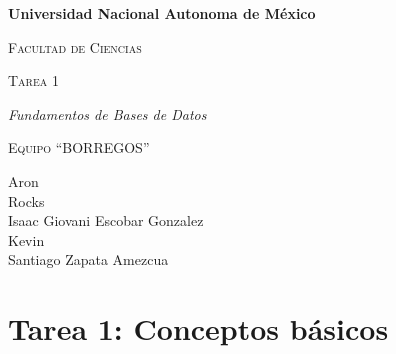 \documentclass[12pt]{report}
\begin{document}
\begin{titlepage}
\centering
{\bfseries\LARGE Universidad Nacional Autonoma de M\'exico \par}
\vspace{1cm}
{\scshape\Large Facultad de Ciencias \par}
\vspace{3cm}
{\scshape\Huge Tarea 1  \par}
\vspace{3cm}
{\itshape\Large Fundamentos de Bases de Datos \par}
\vfill
{\scshape\Huge Equipo ``BORREGOS'' \par}
\vspace{3cm}
{\Large Aron\\ Rocks\\ Isaac Giovani Escobar Gonzalez \\ Kevin\\ Santiago Zapata Amezcua \par}
\vfill
\end{titlepage}
\clearpage

\setcounter{page}{1}

\section*{Tarea 1: Conceptos b\'asicos}
\end{document}
